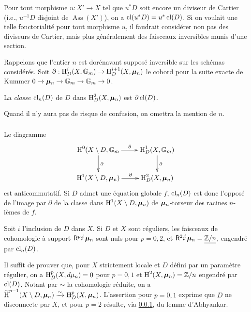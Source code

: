 Pour tout morphisme $u:X'\to X$ tel que $u^* D$ soit encore un diviseur de 
Cartier (i.e., $u^{-1} D$ disjoint de $\operatorname{Ass}(X')$), on a 
$\operatorname{cl}(u^* D) = u^*\operatorname{cl}(D)$. Si on voulait une telle 
fonctorialité pour tout morphisme $u$, il faudrait considérer non pas des 
diviseurs de Cartier, mais plus généralement des faisceaux inversibles 
munis d'une section.

Rappelons que l'entier $n$ est dorénavant supposé inversible sur les 
schémas considérés. Soit 
$\partial:\operatorname{H}_D^i(X,\mathbb{G}_m) \to \operatorname{H}_D^{i+1}(X,{\bm\mu}_n)$ le cobord pour la suite 
exacte de Kummer $0 \to {\bm\mu}_n \to \mathbb{G}_m \to \mathbb{G}_m \to 0$.





\begin{definition}\label{IV:2-1-2}
La \emph{classe $\operatorname{cl}_n(D)$} de $D$ dans $\operatorname{H}_D^2(X,{\bm\mu}_n)$ est 
$\partial \operatorname{cl}(D)$. 
\end{definition}

Quand il n'y aura pas de risque de confusion, on omettra la mention de $n$. 





\subsubsection{}\label{IV:2-1-3}

Le diagramme 
\[\xymatrix{
  \h^0(X\setminus D,\dG_m \ar[r]^-\partial \ar[d]^-\partial 
    & \h_D^1(X,\dG_m) \ar[d]^-\partial \\
  \h^1(X\setminus D,\dmu_n) \ar[r]^-\partial 
    & \h_D^2(X,\dmu_n)
}\]
est anticommutatif. Si $D$ admet une équation globale $f$, 
$\operatorname{cl}_n(D)$ est donc l'opposé de l'image par $\partial$ de la 
classe dans $\operatorname{H}^1(X\setminus D,{\bm\mu}_n)$ de ${\bm\mu}_n$-torseur des racines 
$n$-ièmes de $f$. 





\begin{proposition}\label{IV:2-1-4}
Soit $i$ l'inclusion de $D$ dans $X$. Si $D$ et $X$ sont réguliers, les 
faisceaux de cohomologie à support $\mathsf{R}^p i^! {\bm\mu}_n$ sont nuls pour $p=0,2$, 
et $\mathsf{R}^2 i^!{\bm\mu}_n = \underline{\mathbb{Z}/n}$, engendré par 
$\operatorname{cl}_n(D)$. 
\end{proposition}

Il suffit de prouver que, pour $X$ strictement locale et $D$ défini par un 
paramètre régulier, on a $\operatorname{H}_D^p(X,d\mu_n) = 0$ pour $p=0,1$ et 
$\operatorname{H}^2(X,{\bm\mu}_n) = \mathbb{Z}/n$ engendré par $\operatorname{cl}(D)$. Notant par 
$\sim$ la cohomologie réduite, on a 
$\widetilde{\operatorname{H}}^{p-1}(X\setminus D,{\bm\mu}_n)\xrightarrow\sim \operatorname{H}_D^p(X,{\bm\mu}_n)$. L'assertion 
pour $p=0,1$ exprime que $D$ ne disconnecte par $X$, et pour $p=2$ résulte, 
via \ref{IV:2-1-3}, du lemme d'Abhyankar. 

